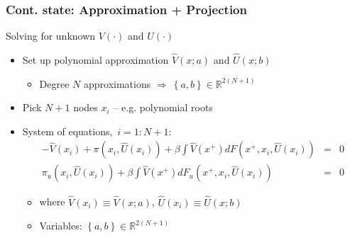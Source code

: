 \documentclass[bigger,handout]{beamer}
\begin{document}
\begin{frame}%
\frametitle{Cont. state: Approximation + Projection}

Solving for unknown $V(\cdot )$ and $U(\cdot )$

\begin{itemize}
\item Set up polynomial approximation $\hat{V}(x;a)$ and $\hat{U}(x;b)$

\begin{itemize}
\item Degree $N$ approximations $\Rightarrow \ \left\{ a,b\right\} \in
\mathbb{R}^{2(N+1)}$
\end{itemize}

\item Pick $N+1$ nodes $x_{i}$ -- e.g. polynomial roots

\item System of equations$,$ $i=1:N+1:$%
\begin{eqnarray*}
-\hat{V}(x_{i})+\pi (x_{i},\hat{U}(x_{i}))+\beta \int \hat{V}%
(x^{+})dF(x^{+},x_{i},\hat{U}(x_{i})) &=&0 \\
\pi _{u}(x_{i},\hat{U}(x_{i}))+\beta \int \hat{V}(x^{+})dF_{u}(x^{+},x_{i},%
\hat{U}(x_{i})) &=&0
\end{eqnarray*}

\begin{itemize}
\item where $\hat{V}(x_{i})\equiv \hat{V}(x;a)$, $\hat{U}(x_{i})\equiv \hat{U%
}(x;b)$

\item Variables: $\left\{ a,b\right\} \in \mathbb{R}^{2(N+1)}$
\end{itemize}
\end{itemize}

\end{frame}%
\end{document}
